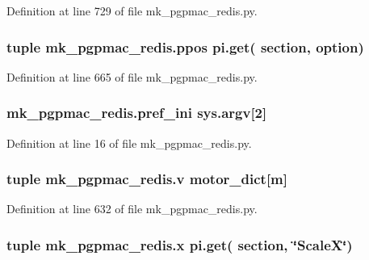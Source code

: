 Definition at line 729 of file mk\-\_\-pgpmac\-\_\-redis.\-py.

\hypertarget{namespacemk__pgpmac__redis_ad9356b4b4c48789f17e6e8fd682e2798}{
\subsubsection[{ppos}]{\setlength{\rightskip}{0pt plus 5cm}tuple mk\-\_\-pgpmac\-\_\-redis.\-ppos pi.\-get( section, option)}}\label{namespacemk__pgpmac__redis_ad9356b4b4c48789f17e6e8fd682e2798}


Definition at line 665 of file mk\-\_\-pgpmac\-\_\-redis.\-py.

\hypertarget{namespacemk__pgpmac__redis_a38c785af5201403976e1267c47ea5096}{
\subsubsection[{pref\-\_\-ini}]{\setlength{\rightskip}{0pt plus 5cm}mk\-\_\-pgpmac\-\_\-redis.\-pref\-\_\-ini sys.\-argv\mbox{[}2\mbox{]}}}\label{namespacemk__pgpmac__redis_a38c785af5201403976e1267c47ea5096}


Definition at line 16 of file mk\-\_\-pgpmac\-\_\-redis.\-py.

\hypertarget{namespacemk__pgpmac__redis_ac732d49b0afca9a9951e3a252bae42fc}{
\subsubsection[{v}]{\setlength{\rightskip}{0pt plus 5cm}tuple mk\-\_\-pgpmac\-\_\-redis.\-v {\bf motor\-\_\-dict}\mbox{[}m\mbox{]}}}\label{namespacemk__pgpmac__redis_ac732d49b0afca9a9951e3a252bae42fc}


Definition at line 632 of file mk\-\_\-pgpmac\-\_\-redis.\-py.

\hypertarget{namespacemk__pgpmac__redis_abc8696f6f2f3fd3edd30989d3c8ec301}{
\subsubsection[{x}]{\setlength{\rightskip}{0pt plus 5cm}tuple mk\-\_\-pgpmac\-\_\-redis.\-x pi.\-get( section, \char`\"{}Scale\-X\char`\"{})}}\label{namespacemk__pgpmac__redis_abc8696f6f2f3fd3edd30989d3c8ec301}


